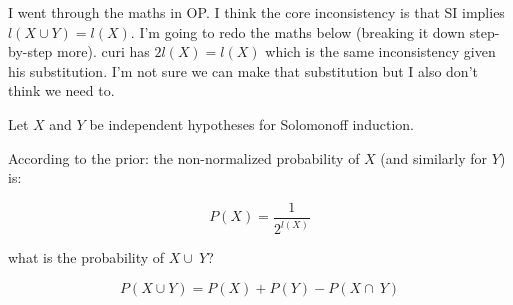\documentclass{article}
\begin{document}
I went through the maths in OP. I think the core inconsistency is that SI implies \(l(X \cup Y) = l(X)\). I'm going to redo the maths below (breaking it down step-by-step more). curi has \(2l(X) = l(X)\) which is the same inconsistency given his substitution. I'm not sure we can make that substitution but I also don't think we need to.

Let $X$ and $Y$ be independent hypotheses for Solomonoff induction.

According to the prior: the non-normalized probability of $X$ (and similarly for $Y$) is:

\begin{equation}
P(X) = \frac{1}{2^{l(X)}}
\end{equation}

what is the probability of \(X\cup~Y\)?

\begin{equation}
P(X \cup Y) = P(X) + P(Y) - P(X\cap~Y)
\end{equation}
\end{document}

